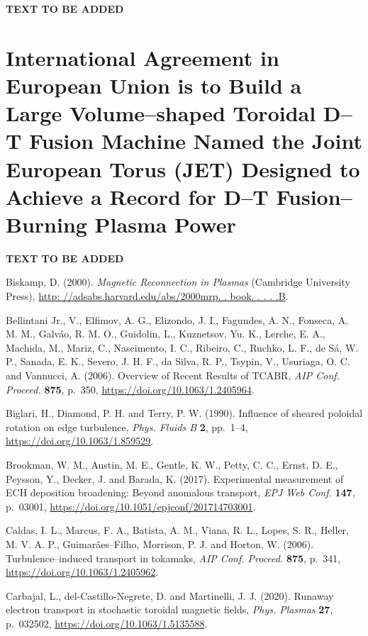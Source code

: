 \documentclass[a4paper,openany,12pt]{book}
\begin{document}
\textbf{TEXT TO BE ADDED}

\section[]{International Agreement in European Union is to Build a Large Volume--shaped Toroidal D--T Fusion Machine Named the Joint European Torus (JET) Designed to Achieve a Record for D--T Fusion--Burning Plasma Power}

\textbf{TEXT TO BE ADDED}

\begin{thebibliography}{175}

\bibitem{}
Biskamp, D. (2000). {\it Magnetic Reconnection in Plasmas} (Cambridge University Press), \url{http: //adsabs.harvard.edu/abs/2000mrp. . book. . . . .B}.

\bibitem{}
Bellintani Jr., V., Elfimov, A. G., Elizondo, J. I., Fagundes, A. N., Fonseca, A. M. M., Galv\'ao, R. M. O., Guidolin, L., Kuznetsov, Yu. K., Lerche, E. A., Machida, M., Mariz, C., Nascimento, I. C., Ribeiro, C., Ruchko, L. F., de S\'a, W. P., Sanada, E. K., Severo, J. H. F., da Silva, R. P., Tsypin, V., Usuriaga, O. C. and Vannucci, A. (2006). Overview of Recent Results of TCABR, {\it AIP Conf. Proceed.} \textbf{875}, p.~350, \url{https://doi.org/10.1063/1.2405964}.

\bibitem{}
Biglari, H., Diamond, P. H. and Terry, P. W. (1990). Influence of sheared poloidal rotation on edge turbulence, {\it Phys. Fluids B} \textbf{2}, pp.~1--4, \url{https://doi.org/10.1063/1.859529}.

\bibitem{}
Brookman, W. M., Austin, M. E., Gentle, K. W., Petty, C. C., Ernst, D. E., Peysson, Y., Decker, J. and Barada, K. (2017). Experimental measurement of ECH deposition broadening: Beyond anomalous transport, \emph{EPJ Web Conf.} \textbf{147}, p.~03001, \url{https://doi.org/10.1051/epjconf/201714703001}.

\bibitem{}
Caldas, I. L., Marcus, F. A., Batista, A. M., Viana, R. L., Lopes, S. R., Heller, M. V. A. P., Guimar\~aes--Filho, Morrison, P. J. and Horton, W. (2006). Turbulence--induced transport in tokamaks, {\it AIP Conf. Proceed.} \textbf{875}, p.~341, \url{https://doi.org/10.1063/1.2405962}.

\bibitem{}
Carbajal, L., del-Castillo-Negrete, D. and Martinelli, J. J. (2020). Runaway electron transport in stochastic toroidal magnetic fields, \emph{Phys. Plasmas} \textbf{27}, p.~032502, \url{https://doi.org/10.1063/1.5135588}.


\end{thebibliography}
\end{document}
